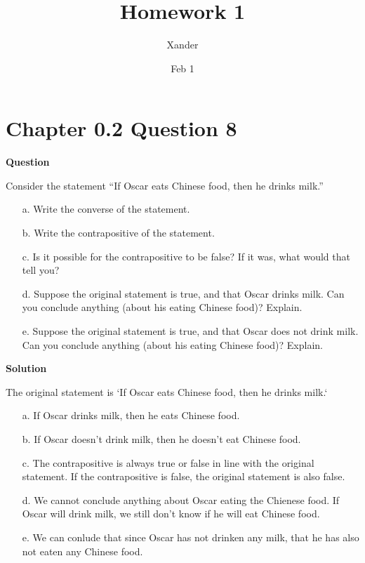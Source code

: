 \documentclass{article}
\title{Homework 1}
\author{Xander}
\date{Feb 1}
\begin{document}
\maketitle



\section*{Chapter 0.2 Question 8} 

\textbf{Question}

Consider the statement “If Oscar eats Chinese food, then he drinks milk.”

\begin{enumerate}
\item[a.] Write the converse of the statement.

\item[b.] Write the contrapositive of the statement.

\item[c.] Is it possible for the contrapositive to be false? If it was, what would that tell you?

\item[d.] Suppose the original statement is true, and that Oscar drinks milk. Can you conclude anything (about his eating Chinese food)? Explain.

\item[e.] Suppose the original statement is true, and that Oscar does not drink milk. Can you conclude anything (about his eating Chinese food)? Explain.
\end{enumerate}

\textbf{Solution}

The original statement is `If Oscar eats Chinese food, then he drinks milk.`
\begin{enumerate}
    \item[a.] If Oscar drinks milk, then he eats Chinese food.
    \item[b.] If Oscar doesn't drink milk, then he doesn't eat Chinese food.
    \item[c.] The contrapositive is always true or false in line with the original statement. If the contrapositive is false, the original statement is also false.
    \item[d.] We cannot conclude anything about Oscar eating the Chienese food. If Oscar will drink milk, we still don't know if he will eat Chinese food.
    \item[e.] We can conlude that since Oscar has not drinken any milk, that he has also not eaten any Chinese food. 
\end{enumerate}
\end{document}
